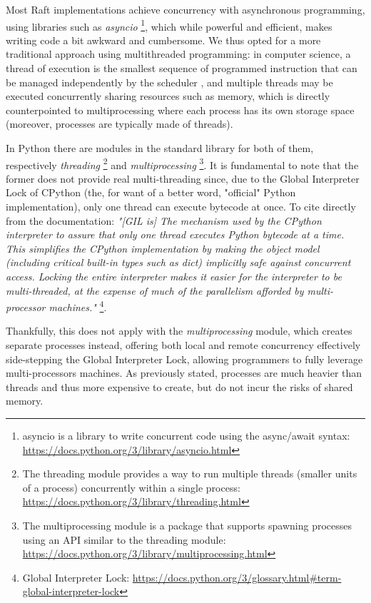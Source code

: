 Most Raft implementations achieve concurrency with asynchronous programming, using libraries such as \textit{asyncio} \footnote{asyncio is a library to write concurrent code using the async/await syntax: \url{https://docs.python.org/3/library/asyncio.html}}, which while powerful and efficient, makes writing code a bit awkward and cumbersome. We thus opted for a more traditional approach using multithreaded programming: in computer science, a thread of execution is the smallest sequence of programmed instruction that can be managed independently by the scheduler \cite{lamportMultiprocessor}, and multiple threads may be executed concurrently sharing resources such as memory, which is directly counterpointed to multiprocessing where each process has its own storage space (moreover, processes are typically made of threads). 

In Python there are modules in the standard library for both of them, respectively \textit{threading} \footnote{The threading module provides a way to run multiple threads (smaller units of a process) concurrently within a single process: \url{https://docs.python.org/3/library/threading.html}} and \textit{multiprocessing} \footnote{The multiprocessing module is a package that supports spawning processes using an API similar to the threading module: \url{https://docs.python.org/3/library/multiprocessing.html}}. It is fundamental to note that the former does not provide real multi-threading since, due to the Global Interpreter Lock of CPython (the, for want of a better word, "official" Python implementation), only one thread can execute bytecode at once. To cite directly from the documentation: \textit{"[GIL is] The mechanism used by the CPython interpreter to assure that only one thread executes Python bytecode at a time. This simplifies the CPython implementation by making the object model (including critical built-in types such as dict) implicitly safe against concurrent access. Locking the entire interpreter makes it easier for the interpreter to be multi-threaded, at the expense of much of the parallelism afforded by multi-processor machines."} \footnote{Global Interpreter Lock: \url{https://docs.python.org/3/glossary.html\#term-global-interpreter-lock}}.

Thankfully, this does not apply with the \textit{multiprocessing} module, which creates separate processes instead, offering both local and remote concurrency effectively side-stepping the Global Interpreter Lock, allowing programmers to fully leverage multi-processors machines. As previously stated, processes are much heavier than threads and thus more expensive to create, but do not incur the risks of shared memory. 

